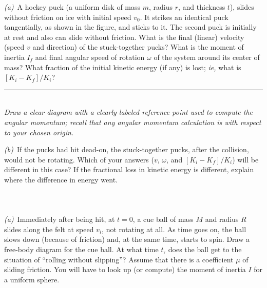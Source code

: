\documentclass[12pt]{article}
\newcounter{problem}
\begin{document}
\textsl{(a)}~A hockey puck (a uniform disk of mass $m$, radius $r$,
and thickness $t$), slides without friction on ice with initial speed
$v_0$.  It strikes an identical puck tangentially, as shown in the
figure, and sticks to it.  The second puck is initially at rest and
also can slide without friction.  What is the final (linear) velocity
(speed $v$ and direction) of the stuck-together pucks?  What is the
moment of inertia $I_f$ and final angular speed of rotation $\omega$
of the system around its center of mass?  What fraction of the initial
kinetic energy (if any) is lost; \textit{ie,} what is $[K_i-K_f]/K_i$?
\\ \rule{0.25\textwidth}{0pt}
\\

\emph{Draw a clear diagram with a clearly labeled reference point used
to compute the angular momentum; recall that any angular momentum
calculation is with respect to your chosen origin.}

\textsl{(b)}~If the pucks had hit dead-on, the stuck-together pucks,
after the collision, would not be rotating.  Which of your answers
($v$, $\omega$, and $[K_i-K_f]/K_i$) will be different in this case?
If the fractional loss in kinetic energy is different, explain where
the difference in energy went.


\paragraph{\problemname~\theproblem}

\textsl{(a)}~Immediately after being hit, at $t=0$, a cue ball of mass
$M$ and radius $R$ slides along the felt at speed $v_i$, not rotating
at all.  As time goes on, the ball slows down (because of friction)
and, at the same time, starts to spin.  Draw a free-body diagram for
the cue ball.  At what time $t_\mathrm{r}$ does the ball get to the
situation of ``rolling without slipping''?  Assume that there is a
coefficient $\mu$ of sliding friction. You will have to look up (or
compute) the moment of inertia $I$ for a uniform sphere.
\end{document}
